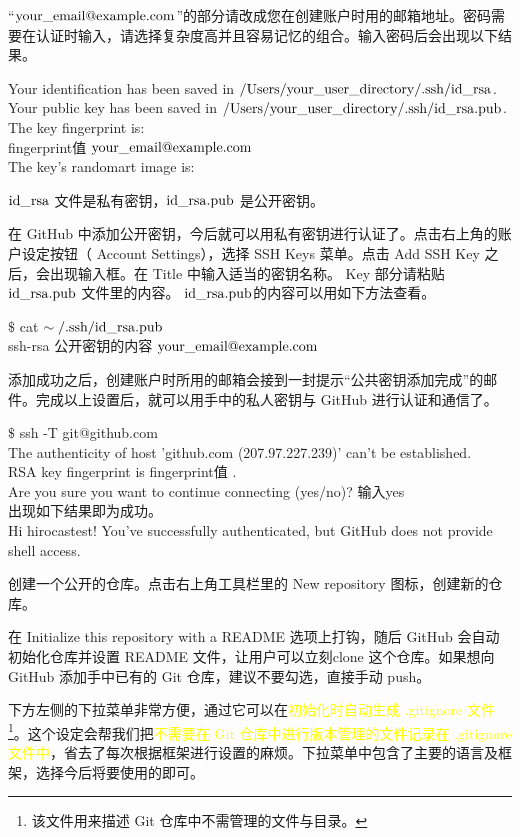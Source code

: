 \documentclass[12pt,a4paper]{article}
\begin{document}
``$\rm your\_email@example.com$”的部分请改成您在创建账户时用的邮箱地址。密码需要在认证时输入，请选择复杂度高并且容易记忆的组合。输入密码后会出现以下结果。

Your identification has been saved in $\rm /Users/your\_user\_directory/.ssh/id\_rsa$. \\
Your public key has been saved in $\rm /Users/your\_user\_directory/.ssh/id\_rsa.pub$. \\
The key fingerprint is: \\
fingerprint值 $\rm your\_email@example.com$ \\
The key's randomart image is:

$\rm id\_rsa$ 文件是私有密钥，$\rm id\_rsa.pub$ 是公开密钥。

在 GitHub 中添加公开密钥，今后就可以用私有密钥进行认证了。点击右上角的账户设定按钮（ Account Settings），选择 SSH Keys 菜单。点击 Add SSH Key 之后，会出现输入框。在 Title 中输入适当的密钥名称。 Key 部分请粘贴 $\rm id\_rsa.pub$ 文件里的内容。 $\rm id\_rsa.pub$的内容可以用如下方法查看。

$\$$ cat $\rm \sim/.ssh/id\_rsa.pub$ \\
ssh-rsa 公开密钥的内容 $\rm your\_email@example.com$

添加成功之后，创建账户时所用的邮箱会接到一封提示“公共密钥添加完成”的邮件。完成以上设置后，就可以用手中的私人密钥与 GitHub 进行认证和通信了。

$\$$ ssh -T git@github.com \\
The authenticity of host 'github.com (207.97.227.239)' can't be established. \\
RSA key fingerprint is fingerprint值 . \\
Are you sure you want to continue connecting (yes/no)? 输入yes \\

出现如下结果即为成功。\\
Hi hirocastest! You've successfully authenticated, but GitHub does not provide shell access.

创建一个公开的仓库。点击右上角工具栏里的 New repository 图标，创建新的仓库。

在 Initialize this repository with a README 选项上打钩，随后 GitHub 会自动初始化仓库并设置 README 文件，让用户可以立刻clone 这个仓库。如果想向 GitHub 添加手中已有的 Git 仓库，建议不要勾选，直接手动 push。

下方左侧的下拉菜单非常方便，通过它可以在\textcolor{yellow}{初始化时自动生成 .gitignore 文件\footnote{该文件用来描述 Git 仓库中不需管理的文件与目录。}}。这个设定会帮我们把\textcolor{yellow}{不需要在 Git 仓库中进行版本管理的文件记录在 .gitignore 文件中}，省去了每次根据框架进行设置的麻烦。下拉菜单中包含了主要的语言及框架，选择今后将要使用的即可。
\end{document}
